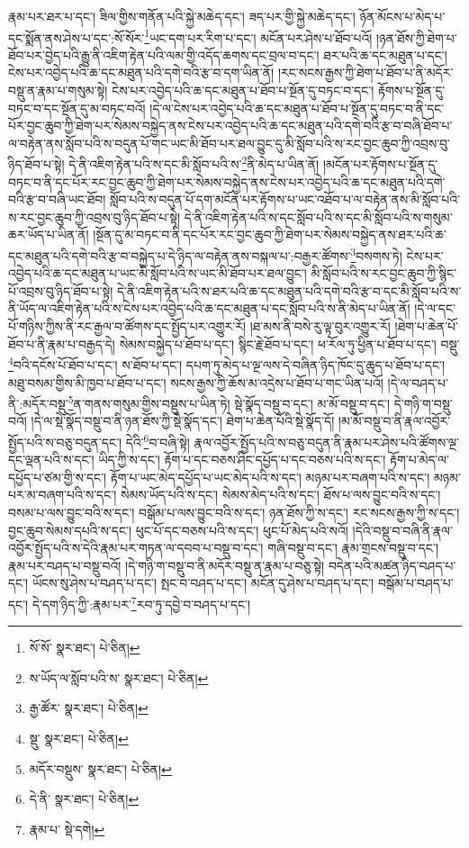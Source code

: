 རྣམ་པར་ཐར་པ་དང་། ཟིལ་གྱིས་གནོན་པའི་སྐྱེ་མཆེད་དང་། ཟད་པར་གྱི་སྐྱེ་མཆེད་དང་། ཉོན་མོངས་པ་མེད་པ་དང་སྨོན་ནས་ཤེས་པ་དང་:སོ་སོར་\footnote{སོ་སོ་  སྣར་ཐང་།  པེ་ཅིན། }ཡང་དག་པར་རིག་པ་དང་། མངོན་པར་ཤེས་པ་ཐོབ་པའོ། །ཉན་ཐོས་ཀྱི་ཐེག་པ་ཐོབ་པར་བྱེད་པའི་རྒྱུ་ནི་འཇིག་རྟེན་པའི་ལམ་གྱི་འདོད་ཆགས་དང་བྲལ་བ་དང་། ཐར་པའི་ཆ་དང་མཐུན་པ་དང་། ངེས་པར་འབྱེད་པའི་ཆ་དང་མཐུན་པའི་དགེ་བའི་རྩ་བ་དག་ཡིན་ནོ། །རང་སངས་རྒྱས་ཀྱི་ཐེག་པ་ཐོབ་པ་ནི་མདོར་བསྡུ་ན་རྣམ་པ་གསུམ་སྟེ། ངེས་པར་འབྱེད་པའི་ཆ་དང་མཐུན་པ་ཐོབ་པ་སྔོན་དུ་བཏང་བ་དང་། རྟོགས་པ་སྔོན་དུ་བཏང་བ་དང་སྔོན་དུ་མ་བཏང་བའོ། །དེ་ལ་ངེས་པར་འབྱེད་པའི་ཆ་དང་མཐུན་པ་ཐོབ་པ་སྔོན་དུ་བཏང་བ་ནི་དང་པོར་བྱང་ཆུབ་ཀྱི་ཐེག་པར་སེམས་བསྐྱེད་ནས་ངེས་པར་འབྱེད་པའི་ཆ་དང་མཐུན་པའི་དགེ་བའི་རྩ་བ་བཞི་ཐོབ་པ་ལ་བརྟེན་ནས་སློབ་པའི་ས་བདུན་པོ་གང་ཡང་མི་ཐོབ་པར་ཐལ་བྱུང་དུ་མི་སློབ་པའི་ས་རང་བྱང་ཆུབ་ཀྱི་འབྲས་བུ་ཉིད་ཐོབ་པ་སྟེ། དེ་ནི་འཇིག་རྟེན་པའི་ས་དང་མི་སློབ་པའི་ས་\footnote{ས་ཡོད་ལ་སློབ་པའི་ས་  སྣར་ཐང་།  པེ་ཅིན། }ནི་མེད་པ་ཡིན་ནོ། །མངོན་པར་རྟོགས་པ་སྔོན་དུ་བཏང་བ་ནི་དང་པོར་རང་བྱང་ཆུབ་ཀྱི་ཐེག་པར་སེམས་བསྐྱེད་ནས་ངེས་པར་འབྱེད་པའི་ཆ་དང་མཐུན་པའི་དགེ་བའི་རྩ་བ་བཞི་ཡང་ཐོབ། སློབ་པའི་ས་བདུན་པོ་དག་མངོན་པར་རྟོགས་པ་ཡང་འཐོབ་པ་ལ་བརྟེན་ནས་མི་སློབ་པའི་ས་རང་བྱང་ཆུབ་ཀྱི་འབྲས་བུ་ཉིད་ཐོབ་པ་སྟེ། དེ་ནི་འཇིག་རྟེན་པའི་ས་དང་སློབ་པའི་ས་དང་མི་སློབ་པའི་ས་གསུམ་ཆར་ཡོད་པ་ཡིན་ནོ། །སྔོན་དུ་མ་བཏང་བ་ནི་དང་པོར་རང་བྱང་ཆུབ་ཀྱི་ཐེག་པར་སེམས་བསྐྱེད་ནས་ཐར་པའི་ཆ་དང་མཐུན་པའི་དགེ་བའི་རྩ་བ་བསྐྱེད་པ་དེ་ཉིད་ལ་བརྟེན་ནས་བསྐལ་པ་:བརྒྱར་ཚོགས་\footnote{རྒྱ་ཚོར་  སྣར་ཐང་།  པེ་ཅིན། }བསགས་ཏེ། ངེས་པར་འབྱེད་པའི་ཆ་དང་མཐུན་པ་ཡང་མི་སློབ་པའི་ས་ཡང་མི་ཐོབ་པར་ཐལ་བྱུང་། མི་སློབ་པའི་ས་རང་བྱང་ཆུབ་ཀྱི་སྙིང་པོ་འབྲས་བུ་ཉིད་ཐོབ་པ་སྟེ། དེ་ནི་འཇིག་རྟེན་པའི་ས་ཐར་པའི་ཆ་དང་མཐུན་པའི་དགེ་བའི་རྩ་བ་དང་མི་སློབ་པའི་ས་ནི་ཡོད་ལ་འཇིག་རྟེན་པའི་ས་ངེས་པར་འབྱེད་པའི་ཆ་དང་མཐུན་པ་དང་སློབ་པའི་ས་ནི་མེད་པ་ཡིན་ནོ། །དེ་ལ་དང་པོ་གཉིས་ཀྱིས་ནི་རང་རྒྱལ་བ་ཚོགས་དང་སྤྱོད་པར་འགྱུར་རོ། །ཐ་མས་ནི་བསེ་རུ་ལྟ་བུར་འགྱུར་རོ། །ཐེག་པ་ཆེན་པོ་ཐོབ་པ་ནི་རྣམ་པ་བརྒྱད་དེ། སེམས་བསྐྱེད་པ་ཐོབ་པ་དང་། སྙིང་རྗེ་ཐོབ་པ་དང་། ཕ་རོལ་ཏུ་ཕྱིན་པ་ཐོབ་པ་དང་། བསྡུ་\footnote{སྡུ་  སྣར་ཐང་།  པེ་ཅིན། }བའི་དངོས་པོ་ཐོབ་པ་དང་། ས་ཐོབ་པ་དང་། དཔག་ཏུ་མེད་པ་ལྔ་ལས་དེ་བཞིན་ཉིད་ཁོང་དུ་ཆུད་པ་ཐོབ་པ་དང་། མཐུ་བསམ་གྱིས་མི་ཁྱབ་པ་ཐོབ་པ་དང་། སངས་རྒྱས་ཀྱི་ཆོས་མ་འདྲེས་པ་ཐོབ་པ་གང་ཡིན་པའོ། །དེ་ལ་བཤད་པ་ནི་:མདོར་བསྡུ་\footnote{མདོར་བསྡུས་  སྣར་ཐང་།  པེ་ཅིན། }ན་གནས་གསུམ་གྱིས་བསྡུས་པ་ཡིན་ཏེ། སྡེ་སྣོད་བསྡུ་བ་དང་། མ་མོ་བསྡུ་བ་དང་། དེ་གཉི་ག་བསྡུ་བའོ། །དེ་ལ་སྡེ་སྣོད་བསྡུ་བ་ནི་ཉན་ཐོས་ཀྱི་སྡེ་སྣོད་དང་། ཐེག་པ་ཆེན་པོའི་སྡེ་སྣོད་དོ། །མ་མོ་བསྡུ་བ་ནི་རྣལ་འབྱོར་སྤྱོད་པའི་ས་བཅུ་བདུན་དང་། དེའི་\footnote{དེ་ནི་  སྣར་ཐང་།  པེ་ཅིན། }བ་བཞི་སྟེ། རྣལ་འབྱོར་སྤྱོད་པའི་ས་བཅུ་བདུན་ནི་རྣམ་པར་ཤེས་པའི་ཚོགས་ལྔ་དང་ལྡན་པའི་ས་དང་། ཡིད་ཀྱི་ས་དང་། རྟོག་པ་དང་བཅས་ཤིང་དཔྱོད་པ་དང་བཅས་པའི་ས་དང་། རྟོག་པ་མེད་ལ་དཔྱོད་པ་ཙམ་གྱི་ས་དང་། རྟོག་པ་ཡང་མེད་དཔྱོད་པ་ཡང་མེད་པའི་ས་དང་། མཉམ་པར་བཞག་པའི་ས་དང་། མཉམ་པར་མ་བཞག་པའི་ས་དང་། སེམས་ཡོད་པའི་ས་དང་། སེམས་མེད་པའི་ས་དང་། ཐོས་པ་ལས་བྱུང་བའི་ས་དང་། བསམ་པ་ལས་བྱུང་བའི་ས་དང་། བསྒོམ་པ་ལས་བྱུང་བའི་ས་དང་། ཉན་ཐོས་ཀྱི་ས་དང་། རང་སངས་རྒྱས་ཀྱི་ས་དང་། བྱང་ཆུབ་སེམས་དཔའི་ས་དང་། ཕུང་པོ་དང་བཅས་པའི་ས་དང་། ཕུང་པོ་མེད་པའི་སའོ། །དེའི་བསྡུ་བ་བཞི་ནི་རྣལ་འབྱོར་སྤྱོད་པའི་ས་དེའི་རྣམ་པར་གཏན་ལ་དབབ་པ་བསྡུ་བ་དང་། གཞི་བསྡུ་བ་དང་། རྣམ་གྲངས་བསྡུ་བ་དང་། རྣམ་པར་བཤད་པ་བསྡུ་བའོ། །དེ་གཉི་ག་བསྡུ་བ་ནི་མདོར་བསྡུ་ན་རྣམ་པ་བཅུ་སྟེ། བདེན་པའི་མཚན་ཉིད་བཤད་པ་དང་། ཡོངས་སུ་ཤེས་པ་བཤད་པ་དང་། སྤང་བ་བཤད་པ་དང་། མངོན་དུ་ཤེས་པ་བཤད་པ་དང་། བསྒོམ་པ་བཤད་པ་དང་། དེ་དག་ཉིད་ཀྱི་:རྣམ་པར་\footnote{རྣམ་པ་  སྡེ་དགེ། }རབ་ཏུ་དབྱེ་བ་བཤད་པ་དང་། 